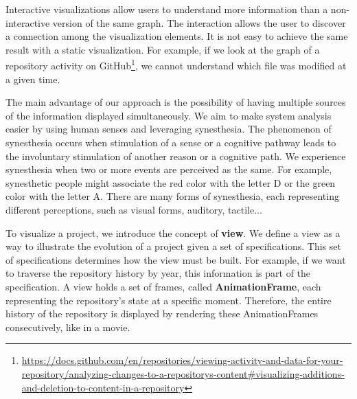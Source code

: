 Interactive visualizations allow users to understand more information than a non-interactive version of the same graph. The interaction allows the user to discover a connection among the visualization elements. It is not easy to achieve the same result with a static visualization. For example, if we look at the graph of a repository activity on GitHub\footnote{\url{https://docs.github.com/en/repositories/viewing-activity-and-data-for-your-repository/analyzing-changes-to-a-repositorys-content\#visualizing-additions-and-deletion-to-content-in-a-repository}}, we cannot understand which file was modified at a given time. 

The main advantage of our approach is the possibility of having multiple sources of the information displayed simultaneously. We aim to make system analysis easier by using human senses and leveraging synesthesia. The phenomenon of synesthesia occurs when stimulation of a sense or a cognitive pathway leads to the involuntary stimulation of another reason or a cognitive path. We experience synesthesia when two or more events are perceived as the same. 
For example, synesthetic people might associate the red color with the letter D or the green color with the letter A. 
There are many forms of synesthesia, each representing different perceptions, such as visual forms, auditory, tactile...

To visualize a project, we introduce the concept of \textbf{view}. We define a view as a way to illustrate the evolution of a project given a set of specifications. This set of specifications determines how the view must be built. For example, if we want to traverse the repository history by year, this information is part of the specification. A view holds a set of frames, called \textbf{AnimationFrame}, each representing the repository's state at a specific moment. Therefore, the entire history of the repository is displayed by rendering these AnimationFrames consecutively, like in a movie. 

